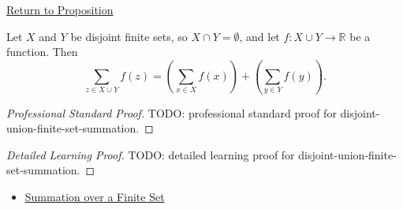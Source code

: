 \newpage
{}
\label{prf:disjoint-union-finite-set-summation}

\begin{remark*}[Return]
\hyperref[prop:disjoint-union-finite-set-summation]{Return to Proposition}
\end{remark*}

\begin{proposition*}
Let \(X\) and \(Y\) be disjoint finite sets, so \(X\cap Y=\emptyset\),
and let \(f:X\cup Y\to\mathbb{R}\) be a function. Then
\[
  \sum_{z\in X\cup Y} f(z)
  =
  \left(\sum_{x\in X} f(x)\right)
  +
  \left(\sum_{y\in Y} f(y)\right).
\]
\end{proposition*}

\begin{proof}[Professional Standard Proof]
\LRAProofBodyStart
TODO: professional standard proof for disjoint-union-finite-set-summation.
\end{proof}

\begin{proof}[Detailed Learning Proof]
\LRAProofBodyStart
TODO: detailed learning proof for disjoint-union-finite-set-summation.
\end{proof}

\begin{remark*}
\end{remark*}

\begin{dependencies}
\begin{itemize}
  \item \hyperref[def:summation-over-finite-set]{Summation over a Finite Set}
\end{itemize}
\end{dependencies}

\clearpage
